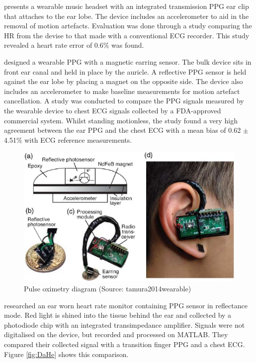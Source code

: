 \cite{shin2009novel} presents a wearable music headset with an integrated transmission PPG ear clip that attaches to the ear lobe. The device includes an accelerometer to aid in the removal of motion artefacts. Evaluation was done through a study comparing the HR from the devise to that made with a conventional ECG recorder. This study revealed a heart rate error of 0.6\% was found.

\medskip

\cite{poh2010motion} designed a wearable PPG with a magnetic earring sensor. The bulk device sits in front ear canal and held in place by the auricle. A reflective PPG sensor is held against the ear lobe by placing a magnet on the opposite side. The device also includes an accelerometer to make baseline measurements for motion artefact cancellation. A study was conducted to compare the PPG signals measured by the wearable device to chest ECG signals collected by a FDA-approved commercial system. Whilst standing motionless, the study found a very high agreement between the ear PPG and the chest ECG with a mean bias of 0.62 $\pm$ 4.51\% with ECG reference measurements.

\medskip

\begin{figure}[h]
   \centering
   \includegraphics[scale=1.2]{figs/poh}
   \caption{Pulse oximetry diagram (Source: tamura2014wearable)}
   \label{fig:poh}
\end{figure}

\cite{da2010ear} researched an ear worn heart rate monitor containing PPG sensor in reflectance mode. Red light is shined into the tissue behind the ear and collected by a photodiode chip with an integrated transimpedance amplifier. Signals were not digitalised on the device, but recorded and processed on MATLAB. They compared their collected signal with a transition finger PPG and a chest ECG. Figure \ref{fig:DaHe} shows this comparison.

